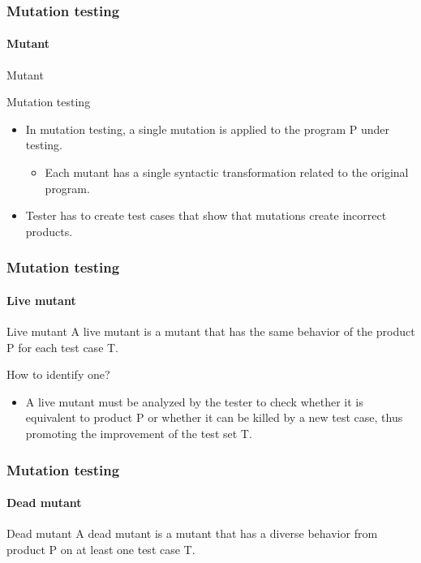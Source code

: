 \begin{frame}[parent={concept:mutation-testing}, hasprev=false, hasnext=true]
\frametitle{Mutation testing}
\framesubtitle{Mutant}
\label{concept:mutant}

\begin{block:concept}{Mutant}
\end{block:concept}


\begin{block:fact}{Mutation testing}
\begin{itemize}
	\item In mutation testing, a single mutation is applied to the program P
	under testing.
	\begin{itemize}
		\item Each mutant has a single syntactic transformation related to the
		original program.
	\end{itemize}

	\item Tester has to create test cases that show that mutations create
	incorrect products.
\end{itemize}
\end{block:fact}
\end{frame}



\begin{frame}
\frametitle{Mutation testing}
\framesubtitle{Live mutant}
\label{concept:live-mutant}

\begin{block:concept}{Live mutant}
A live mutant is a mutant that has the same behavior of the product P for each
test case T.
\end{block:concept}

\begin{block:fact}{How to identify one?}
\begin{itemize}
	\item A live mutant must be analyzed by the tester to check whether it is
	equivalent to product P or whether it can be killed by a new test case,
	thus promoting the improvement of the test set T.
\end{itemize}
\end{block:fact}
\end{frame}


\begin{frame}
\frametitle{Mutation testing}
\framesubtitle{Dead mutant}
\label{concept:dead-mutant}

\begin{block:concept}{Dead mutant}
A dead mutant is a mutant that has a diverse behavior from product P on at
least one test case T.
\end{block:concept}
\end{frame}


